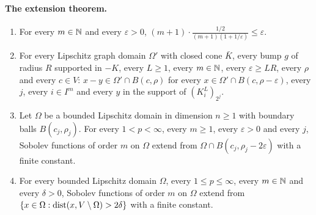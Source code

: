 \paragraph{The extension theorem.}

\begin{lemma}
\label{lem:higher-patches}
\leanok
{}
\begin{enumerate}
  \item For every $m \in \mathbb{N}$ and every $\varepsilon > 0$,
    $(m + 1) \cdot \frac{1/2}{(m + 1)(1 + 1/\varepsilon)} \leq \varepsilon$.
  \item For every Lipschitz graph domain $\Omega'$ with closed cone $\bar K$, every bump $g$ of
    radius $R$ supported in $-K$, every $L \geq 1$, every $m \in \mathbb{N}$, every
    $\varepsilon \geq L R$, every $\rho$ and every $c \in V$: $x - y \in \Omega' \cap B(c, \rho)$
    for every $x \in \Omega' \cap B(c, \rho - \varepsilon)$, every $j$, every $i \in I^m$ and
    every $y$ in the support of $(K^L_i)_{2^j}$.
  \item Let $\Omega$ be a bounded Lipschitz domain in dimension $n \geq 1$ with boundary balls
    $B(c_j, \rho_j)$. For every $1 < p < \infty$, every $m \geq 1$, every $\varepsilon > 0$ and
    every $j$, Sobolev functions of order $m$ on $\Omega$ extend from
    $\Omega \cap B(c_j, \rho_j - 2 \varepsilon)$ with a finite constant.
  \item For every bounded Lipschitz domain $\Omega$, every $1 \leq p \leq \infty$, every
    $m \in \mathbb{N}$ and every $\delta > 0$, Sobolev functions of order $m$ on $\Omega$ extend from
    $\{x \in \Omega : \operatorname{dist}(x, V \setminus \Omega) > 2 \delta\}$ with a finite constant.
\end{enumerate}
\end{lemma}

